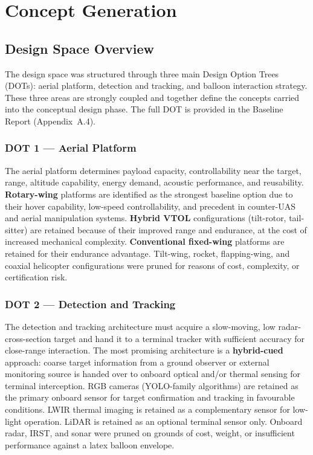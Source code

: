 \chapter{Concept Generation}


\section{Design Space Overview}

The design space was structured through three main Design Option
Trees (DOTs): aerial platform, detection and tracking, and balloon
interaction strategy. These three areas are strongly coupled and
together define the concepts carried into the conceptual design
phase. The full DOT is provided in the Baseline Report
(Appendix~A.4).

\subsection*{DOT 1 — Aerial Platform}
The aerial platform determines payload capacity,
controllability near the target, range, altitude capability,
energy demand, acoustic performance, and reusability.
\textbf{Rotary-wing} platforms are identified as the strongest
baseline option due to their hover capability, low-speed
controllability, and precedent in counter-UAS and aerial
manipulation systems. \textbf{Hybrid VTOL} configurations
(tilt-rotor, tail-sitter) are retained because of their
improved range and endurance, at the cost of increased
mechanical complexity. \textbf{Conventional fixed-wing}
platforms are retained for their endurance advantage.
Tilt-wing, rocket, flapping-wing, and coaxial helicopter
configurations were pruned for reasons of cost, complexity,
or certification risk.

\subsection*{DOT 2 — Detection and Tracking}
The detection and tracking architecture must acquire a
slow-moving, low radar-cross-section target and hand it to a
terminal tracker with sufficient accuracy for close-range
interaction. The most promising architecture is a
\textbf{hybrid-cued} approach: coarse target information from
a ground observer or external monitoring source is handed over
to onboard optical and/or thermal sensing for terminal
interception. RGB cameras (YOLO-family algorithms) are retained
as the primary onboard sensor for target confirmation and
tracking in favourable conditions. LWIR thermal imaging is
retained as a complementary sensor for low-light operation.
LiDAR is retained as an optional terminal sensor only.
Onboard radar, IRST, and sonar were pruned on grounds of cost,
weight, or insufficient performance against a latex balloon
envelope.

